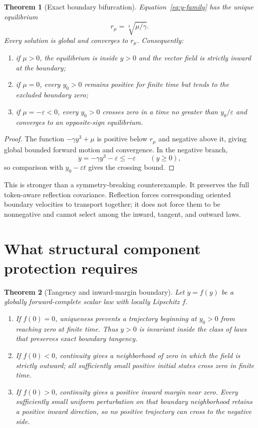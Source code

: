 \documentclass[11pt]{article}
\newtheorem{theorem}{Theorem}
\begin{document}
\begin{theorem}[Exact boundary bifurcation]
\label{thm:bifurcation}
Equation~\eqref{eq:y-family} has the unique equilibrium
\[
 r_\mu=\sqrt[3]{\mu/\gamma}.
\]
Every solution is global and converges to $r_\mu$.  Consequently:
\begin{enumerate}
 \item if $\mu>0$, the equilibrium is inside $y>0$ and the vector field is
 strictly inward at the boundary;
 \item if $\mu=0$, every $y_0>0$ remains positive for finite time but tends
 to the excluded boundary zero;
 \item if $\mu=-\varepsilon<0$, every $y_0>0$ crosses zero in a time no
 greater than $y_0/\varepsilon$ and converges to an opposite-sign
 equilibrium.
\end{enumerate}
\end{theorem}

\begin{proof}
The function $-\gamma y^3+\mu$ is positive below $r_\mu$ and negative above
it, giving global bounded forward motion and convergence.  In the negative
branch,
\[
 \dot y=-\gamma y^3-\varepsilon\leq-\varepsilon
 \qquad (y\geq0),
\]
so comparison with $y_0-\varepsilon t$ gives the crossing bound.
\end{proof}

This is stronger than a symmetry-breaking counterexample.  It preserves the
full token-aware reflection covariance.  Reflection forces corresponding
oriented boundary velocities to transport together; it does not force them to
be nonnegative and cannot select among the inward, tangent, and outward laws.

\section{What structural component protection requires}

\begin{theorem}[Tangency and inward-margin boundary]
\label{thm:tangency}
Let $\dot y=f(y)$ be a globally forward-complete scalar law with locally
Lipschitz $f$.
\begin{enumerate}
 \item If $f(0)=0$, uniqueness prevents a trajectory beginning at $y_0>0$
 from reaching zero at finite time.  Thus $y>0$ is invariant inside the
 class of laws that preserves exact boundary tangency.
 \item If $f(0)<0$, continuity gives a neighborhood of zero in which the
 field is strictly outward; all sufficiently small positive initial states
 cross zero in finite time.
 \item If $f(0)>0$, continuity gives a positive inward margin near zero.
 Every sufficiently small uniform perturbation on that boundary neighborhood
 retains a positive inward direction, so no positive trajectory can cross to
 the negative side.
\end{enumerate}
\end{theorem}
\end{document}
